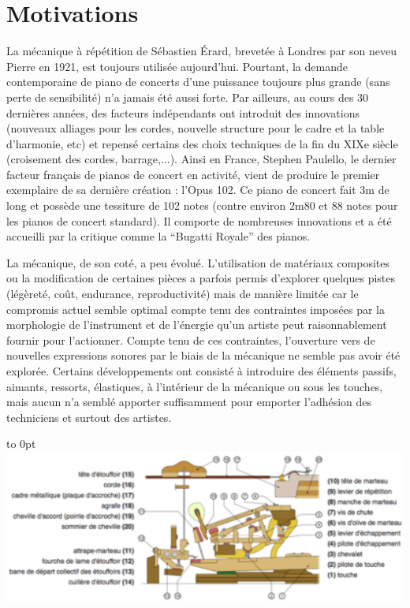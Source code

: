 \documentclass[french,a4paper,12pt]{report}
\begin{document}
 \section{Motivations}
 
 La mécanique à répétition de Sébastien Érard, brevetée à Londres par son neveu Pierre en 1921, est toujours utilisée aujourd’hui. Pourtant, la demande contemporaine de piano de concerts d’une puissance toujours plus grande (sans perte de sensibilité) n’a jamais été aussi forte. Par ailleurs, au cours des 30 dernières années, des facteurs indépendants ont introduit des innovations (nouveaux alliages pour les cordes, nouvelle structure pour le cadre et la table d’harmonie, etc) et repensé certains des choix techniques de la fin du XIXe siècle (croisement des cordes, barrage,...). Ainsi en France, Stephen Paulello, le dernier facteur français de pianos de concert en activité, vient de produire le premier exemplaire de sa dernière création : l’Opus 102. Ce piano de concert fait 3m de long et possède une tessiture de 102 notes (contre environ 2m80 et 88 notes pour les pianos de concert standard). Il comporte de nombreuses innovations et a été accueilli par la critique comme la “Bugatti Royale” des pianos.

La mécanique, de son coté, a peu évolué. L’utilisation de matériaux composites ou la modification de certaines pièces a parfois permis d’explorer quelques pistes (légèreté, coût, endurance, reproductivité) mais de manière limitée car le compromis actuel semble optimal compte tenu des contraintes imposées par la morphologie de l’instrument et de l’énergie qu’un artiste peut raisonnablement fournir pour l’actionner. Compte tenu de ces contraintes, l’ouverture vers de nouvelles expressions sonores par le biais de la mécanique ne semble pas
avoir été explorée. Certains développements ont consisté à introduire des éléments passifs, aimants, ressorts, élastiques, à l’intérieur de la mécanique ou sous les touches, mais aucun n’a semblé apporter suffisamment pour emporter l’adhésion des techniciens et surtout des artistes.\newline

\hfill\hbox to 0pt{\hss\includegraphics[width=15cm]{MECA_PIANO.png}\hss}\hfill\null\newline
\end{document}
